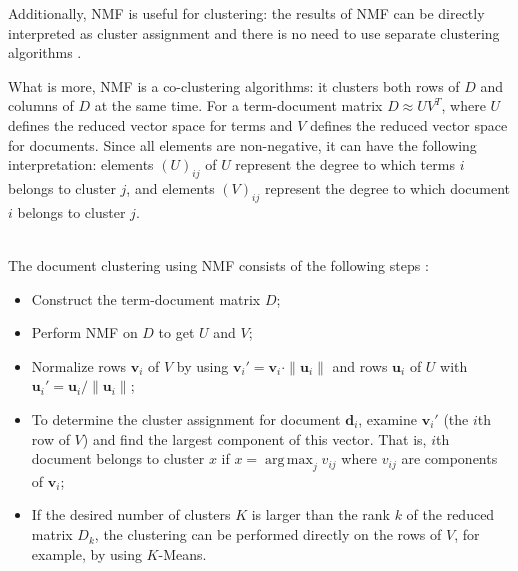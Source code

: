 Additionally, NMF is useful for clustering: the results of NMF can 
be directly interpreted as cluster assignment and there is no need 
to use separate clustering algorithms \cite{xu2003document}. 

What is more, NMF is a co-clustering algorithms: it clusters both
rows of $D$ and columns of $D$ at the same time. For a term-document
matrix $D \approx U V^T$, where $U$ defines the reduced vector space for terms
and $V$ defines the reduced vector space for documents. Since all elements 
are non-negative, it can have the following interpretation: 
elements $(U)_{ij}$ of $U$ represent the degree to which terms $i$ belongs to cluster $j$, 
and elements $(V)_{ij}$ represent the degree to which document $i$ belongs to cluster $j$. 

\ \\

The document clustering using NMF consists of the following 
steps \cite{xu2003document}:

\begin{itemize}
  \item Construct the term-document matrix $D$;
  \item Perform NMF on $D$ to get $U$ and $V$;
  \item Normalize rows $\mathbf v_i$ of $V$ by using $\mathbf v_i' = \mathbf v_i \cdot \| \mathbf u_i \|$ and rows $\mathbf u_i$ of $U$ with $\mathbf u_i' = \mathbf u_i / \| \mathbf u_i \|$;
  \item To determine the cluster assignment for document $\mathbf d_i$, examine $\mathbf v_i'$ (the $i$th row of $V$) and find the largest component of this vector. That is, 
      $i$th document belongs to cluster $x$ if $x = \operatorname{arg \, max}_j v_{ij}$ where $v_{ij}$ are components of $\mathbf v_i$;
  \item If the desired number of clusters $K$ is larger than the rank $k$ of the reduced matrix $D_k$, the clustering can be performed directly on the rows of $V$, for example, 
      by using $K$-Means.
\end{itemize}

